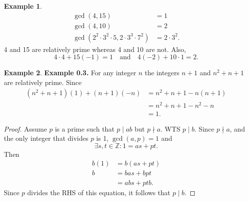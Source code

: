 \documentclass{article}
\newtheorem{corollary}{Corollary}[theorem]
\newtheorem{lemma}{Lemma}[section]
\theoremstyle{definition}
\newtheorem{example}{Example}[section]
\begin{document}
\noindent{}

\begin{example}
\begin{align*}
    \gcd(4,15) &= 1 \\
    \gcd(4,10) &= 2 \\
    \gcd(2^2\cdot3^2\cdot5, 2\cdot3^3\cdot7^2) &=2 \cdot3^2.
\end{align*}
4 and 15 are relatively prime whereas 4 and 10 are not. Also,
\begin{equation*}
    4\cdot4+15(-1)=1 \quad \text{and} \quad 4(-2)+10\cdot1=2.
\end{equation*}
\end{example}

\begin{example}
\textbf{Example 0.3.} For any integer $n$ the integers $n+1$ and $n^2+n+1$ are relatively prime. Since
\begin{align*}
    (n^2+n+1)(1) + (n+1)(-n) &= n^2+n+1-n(n+1) \\
    &= n^2+n+1-n^2-n \\ 
    &= 1.
\end{align*}
\end{example}

\noindent{}

\begin{proof}
    Assume $p$ is a prime such that $p \mid ab$ but $p \nmid a$. WTS $p \mid b$. Since $p \nmid a$, and the only integer that divides $p$ is 1, $\gcd(a,p) = 1$ and
    \begin{equation*}
        \exists s,t \in \mathbb{Z}: 1 = as+pt.
    \end{equation*}
    Then
    \begin{align*}
        b(1) &= b(as+pt) \\
        b &= bas + bpt \\ 
        &= abs + ptb.
    \end{align*}
    Since $p$ divides the RHS of this equation, it follows that $p \mid b$.
\end{proof}
\end{document}
